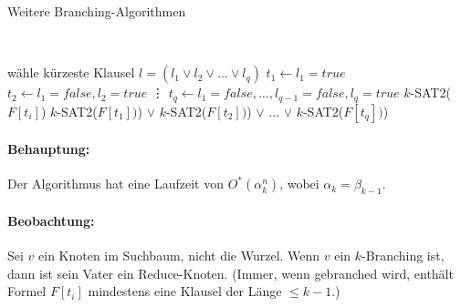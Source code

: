 \begin{section}{Weitere Branching-Algorithmen}
\begin{algorithm}[H]
     \\


    wähle {\color{red}kürzeste} Klausel \(l = (l_1 \vee l_2 \vee ... \vee l_q)\)\;
    $t_1 \leftarrow l_1 = true$\; 
    $t_2 \leftarrow l_1 = false, l_2 = true$\;
    \vdots
    $t_q \leftarrow l_1 = false, \dots, l_{q-1} = false, l_q = true$\; 
    {\color{red} 
       {
	\Return $k$-SAT2($F[t_i]$)
      }
    }
    \Return \(k\)-SAT2(\(F[t_1])\)) \(\vee\) \(k\)-SAT2(\(F[t_2])\)) \(\vee\) ... \(\vee\) \(k\)-SAT2(\(F[t_q])\))\;
  \end{algorithm}
  \paragraph{Behauptung:} Der Algorithmus hat eine Laufzeit von $O^*(\alpha_k^n)$, wobei $\alpha_k = \beta_{k-1}$.
  \paragraph{Beobachtung:} Sei $v$ ein Knoten im Suchbaum, nicht die Wurzel. Wenn $v$ ein $k$-Branching ist, dann ist sein Vater ein Reduce-Knoten. (Immer, wenn gebranched wird, enthält Formel $F[t_i]$ mindestens eine Klausel der Länge $\leq k-1$.)
\end{section}
  
  